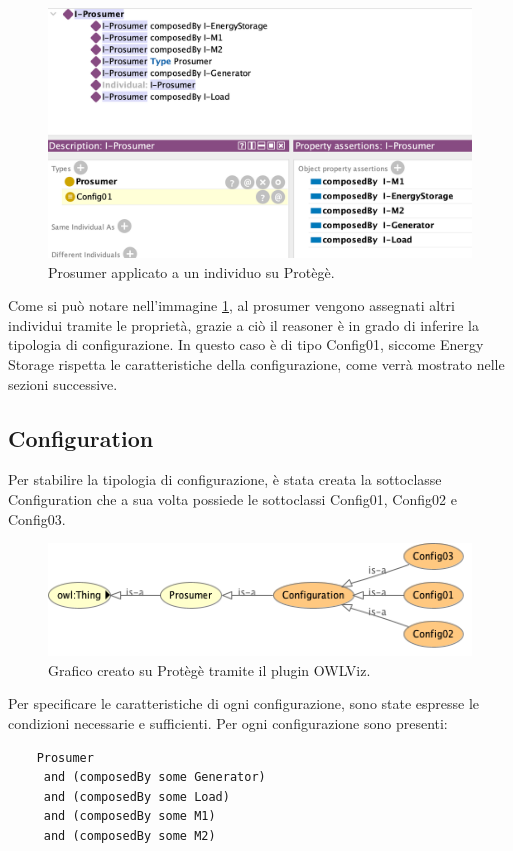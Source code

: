 \begin{figure}[!ht]
    \centering
    \includegraphics[width=12cm]{images/individual_prosumer.png}
    \caption{Prosumer applicato a un individuo su Protègè.}
    \label{fig:individual_prosumer}
\end{figure}

Come si può notare nell'immagine \ref*{fig:individual_prosumer}, al prosumer vengono assegnati altri individui tramite le proprietà, grazie a ciò il reasoner è in grado di inferire la tipologia di configurazione.
In questo caso è di tipo Config01, siccome Energy Storage rispetta le caratteristiche della configurazione, come verrà mostrato nelle sezioni successive.

\subsection{Configuration}
Per stabilire la tipologia di configurazione, è stata creata la sottoclasse Configuration che a sua volta possiede le sottoclassi Config01, Config02 e Config03.

\begin{figure}[!ht]
    \centering
    \includegraphics[width=12cm]{images/pros_graph.png}
    \caption{Grafico creato su Protègè tramite il plugin OWLViz.}
    \label{fig:pros_graph}
\end{figure}

Per specificare le caratteristiche di ogni configurazione, sono state espresse le condizioni necessarie e sufficienti. Per ogni configurazione sono presenti:
\begin{verbatim}
    Prosumer 
     and (composedBy some Generator) 
     and (composedBy some Load) 
     and (composedBy some M1) 
     and (composedBy some M2) 
\end{verbatim}


